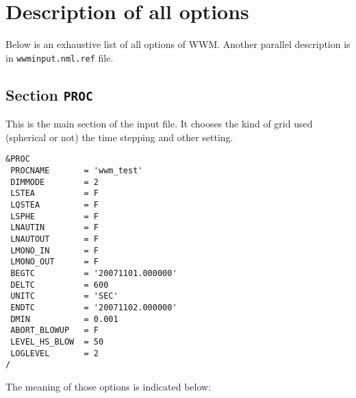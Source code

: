 \documentclass[12pt]{amsart}
\begin{document}
\section{Description of all options}
Below is an exhaustive list of all options of WWM.
Another parallel description is in {\tt wwminput.nml.ref} file.

\subsection{Section {\tt PROC}}
This is the main section of the input file. It chooses the kind of grid used (spherical or not) the time stepping and other setting.
\begin{verbatim}
&PROC
 PROCNAME       = 'wwm_test'
 DIMMODE        = 2
 LSTEA          = F
 LQSTEA         = F
 LSPHE          = F
 LNAUTIN        = F
 LNAUTOUT       = F
 LMONO_IN       = F                
 LMONO_OUT      = F
 BEGTC          = '20071101.000000'
 DELTC          = 600              
 UNITC          = 'SEC'            
 ENDTC          = '20071102.000000'
 DMIN           = 0.001            
 ABORT_BLOWUP   = F
 LEVEL_HS_BLOW  = 50
 LOGLEVEL       = 2
/
\end{verbatim}
The meaning of those options is indicated below:
\end{document}

